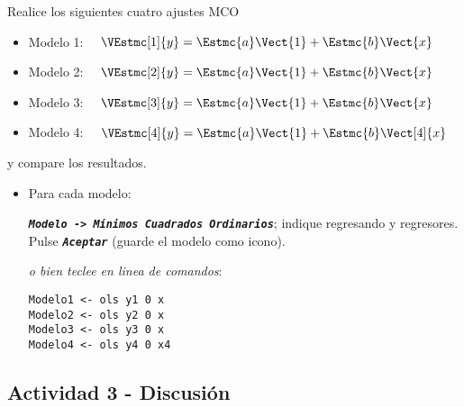 \documentclass[11pt]{article}
\begin{document}
Realice los siguientes cuatro ajustes MCO
\begin{itemize}
\item Modelo 1: \(\quad \VEstmc[1]{y} = \Estmc{a}\Vect{1} + \Estmc{b}\Vect{x}\)
\item Modelo 2: \(\quad \VEstmc[2]{y} = \Estmc{a}\Vect{1} + \Estmc{b}\Vect{x}\)
\item Modelo 3: \(\quad \VEstmc[3]{y} = \Estmc{a}\Vect{1} + \Estmc{b}\Vect{x}\)
\item Modelo 4: \(\quad \VEstmc[4]{y} = \Estmc{a}\Vect{1} + \Estmc{b}\Vect[4]{x}\)
\end{itemize}

y compare los resultados.

\begin{itemize}
\item Para cada modelo:

\textbf{\emph{\texttt{Modelo -> Mínimos Cuadrados Ordinarios}}}; indique regresando y
regresores. Pulse \textbf{\emph{\texttt{Aceptar}}} (guarde el modelo como icono).

{\vspace{3pt} \color{gray!70!black}
\emph{o bien teclee en linea de comandos}:
\begin{verbatim}
Modelo1 <- ols y1 0 x
Modelo2 <- ols y2 0 x
Modelo3 <- ols y3 0 x
Modelo4 <- ols y4 0 x4
\end{verbatim}
}
\end{itemize}

\subsection{Actividad 3 - Discusión}
\label{sec:org36f7834}
\end{document}

